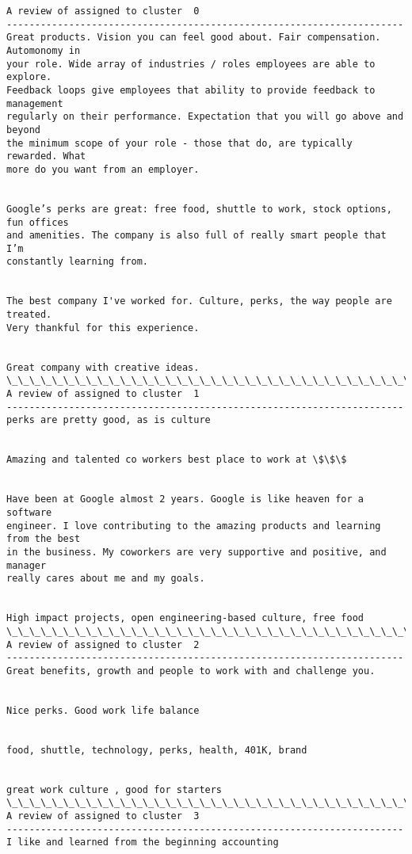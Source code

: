 \documentclass[11pt]{article}
\begin{document}
    \begin{Verbatim}[commandchars=\\\{\}]
A review of assigned to cluster  0
----------------------------------------------------------------------
Great products. Vision you can feel good about. Fair compensation. Automonomy in
your role. Wide array of industries / roles employees are able to explore.
Feedback loops give employees that ability to provide feedback to management
regularly on their performance. Expectation that you will go above and beyond
the minimum scope of your role - those that do, are typically rewarded. What
more do you want from an employer.


Google’s perks are great: free food, shuttle to work, stock options, fun offices
and amenities. The company is also full of really smart people that I’m
constantly learning from.


The best company I've worked for. Culture, perks, the way people are treated.
Very thankful for this experience.


Great company with creative ideas.
\_\_\_\_\_\_\_\_\_\_\_\_\_\_\_\_\_\_\_\_\_\_\_\_\_\_\_\_\_\_\_\_\_\_\_\_\_\_\_\_\_\_\_\_\_\_\_\_\_\_\_\_\_\_\_\_\_\_\_\_\_\_\_\_\_\_\_\_\_\_
A review of assigned to cluster  1
----------------------------------------------------------------------
perks are pretty good, as is culture


Amazing and talented co workers best place to work at \$\$\$


Have been at Google almost 2 years. Google is like heaven for a software
engineer. I love contributing to the amazing products and learning from the best
in the business. My coworkers are very supportive and positive, and manager
really cares about me and my goals.


High impact projects, open engineering-based culture, free food
\_\_\_\_\_\_\_\_\_\_\_\_\_\_\_\_\_\_\_\_\_\_\_\_\_\_\_\_\_\_\_\_\_\_\_\_\_\_\_\_\_\_\_\_\_\_\_\_\_\_\_\_\_\_\_\_\_\_\_\_\_\_\_\_\_\_\_\_\_\_
A review of assigned to cluster  2
----------------------------------------------------------------------
Great benefits, growth and people to work with and challenge you.


Nice perks. Good work life balance


food, shuttle, technology, perks, health, 401K, brand


great work culture , good for starters
\_\_\_\_\_\_\_\_\_\_\_\_\_\_\_\_\_\_\_\_\_\_\_\_\_\_\_\_\_\_\_\_\_\_\_\_\_\_\_\_\_\_\_\_\_\_\_\_\_\_\_\_\_\_\_\_\_\_\_\_\_\_\_\_\_\_\_\_\_\_
A review of assigned to cluster  3
----------------------------------------------------------------------
I like and learned from the beginning accounting



\end{Verbatim}
\end{document}
